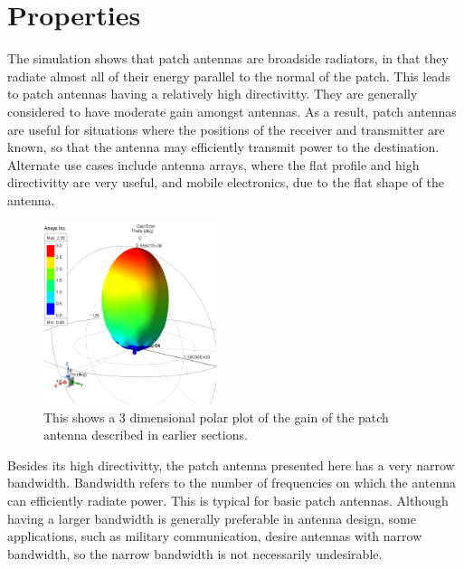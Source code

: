 \documentclass[12pt]{article}
\begin{document}
\section{Properties}

The simulation shows that patch antennas are broadside radiators, in that they radiate almost all of their energy parallel to the normal of the patch. This leads to patch antennas having a relatively high directivitty. They are generally considered to have moderate gain amongst antennas\cite{khan2015microstrip}. As a result, patch antennas are useful for situations where the positions of the receiver and transmitter are known, so that the antenna may efficiently transmit power to the destination. Alternate use cases include antenna arrays, where the flat profile and high directivitty are very useful, and mobile electronics, due to the flat shape of the antenna. 
\newpage
\begin{figure}[h]
    \centering
    \includegraphics[width=0.45\textwidth]{basic-patch-antenna-gain.png}
    \caption{This shows a 3 dimensional polar plot of the gain of the patch antenna described in earlier sections.}
\end{figure}

Besides its high directivitty, the patch antenna presented here has a very narrow bandwidth. Bandwidth refers to the number of frequencies on which the antenna can efficiently radiate power. This is typical for basic patch antennas\cite{balanis2016antenna}. Although having a larger bandwidth is generally preferable in antenna design, some applications, such as military communication, desire antennas with narrow bandwidth\cite{balanis2016antenna}, so the narrow bandwidth is not necessarily undesirable.
\end{document}

